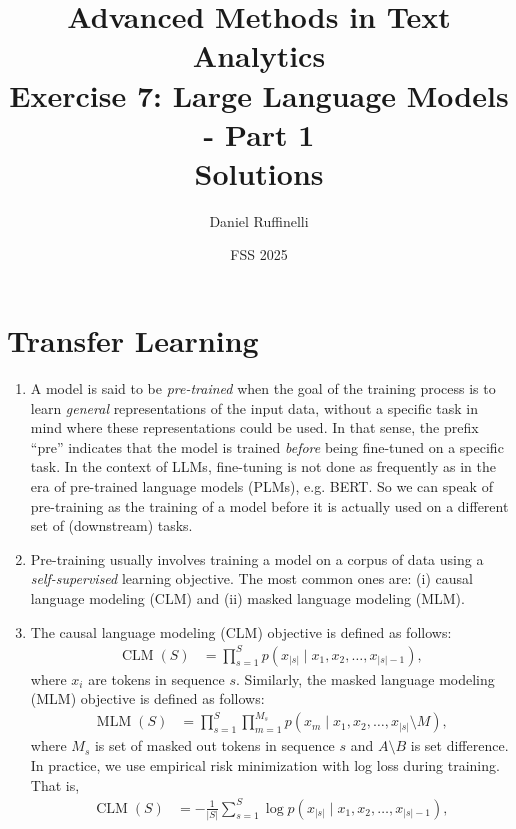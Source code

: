 \documentclass[11pt,a4paper]{article}
\title{Advanced Methods in Text Analytics \\ 
Exercise 7: Large Language Models - Part 1\\
\textbf{Solutions}}
\author{Daniel Ruffinelli}
\date{FSS 2025}
\newcommand\op[1]{\operatorname{#1}}
\begin{document}
\maketitle

\section{Transfer Learning}

\begin{enumerate}[label=(\alph*)]
    \item A model is said to be \emph{pre-trained} when the goal of the training
          process is to learn \emph{general} representations of the input data,
          without a specific task in mind where these representations could be
          used.
          In that sense, the prefix ``pre'' indicates that the model
          is trained \emph{before} being fine-tuned on a specific task.
          In the context of LLMs, fine-tuning is not done as frequently as in
          the era of pre-trained language models (PLMs), e.g. BERT.
          So we can speak of pre-training as the training of a model before it
          is actually used on a different set of (downstream) tasks.
    \item Pre-training usually involves training a model on a corpus of data
          using a \emph{self-supervised} learning objective.
          The most common ones are: (i) causal language modeling (CLM) and (ii)
          masked language modeling (MLM).
    \item The causal language modeling (CLM) objective is defined as follows:
          \begin{align}
              \op{CLM}(S) & = \prod_{s=1}^{S} p(x_{|s|} \mid x_1, x_2, \ldots, x_{|s|-1}),
          \end{align}
          where $x_i$ are tokens in sequence $s$.
          Similarly, the masked language modeling (MLM) objective is defined as
          follows:
          \begin{align}
              \op{MLM}(S) & = \prod_{s=1}^{S} \prod_{m=1}^{M_s} p(x_m \mid x_1, x_2, \ldots, x_{|s|} \setminus M),
          \end{align}
          where $M_s$ is set of masked out tokens in sequence $s$ and
          $A \setminus B$ is set difference.
          In practice, we use empirical risk minimization with log loss during
          training. That is,
          \begin{align}
              \op{CLM}(S) & = - \frac{1}{|S|} \sum_{s=1}^{S} \log p(x_{|s|} \mid x_1, x_2, \ldots, x_{|s|-1}),

\end{align}
\end{enumerate}
\end{document}
